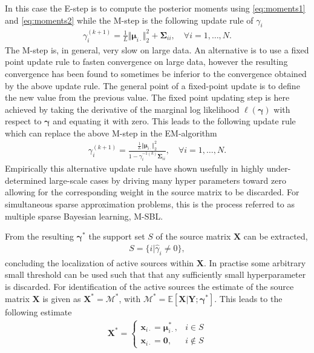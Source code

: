 In this case the E-step is to compute the posterior moments using \eqref{eq:moments1} and \eqref{eq:moments2} while the M-step is the following update rule of $\gamma_i$ \cite[p.147]{phd_wipf}
\begin{align*}
\gamma_i^{(k+1)} = \frac{1}{L} \Vert \boldsymbol{\mu}_{i \cdot} \Vert_2^2 + \boldsymbol{\Sigma}_{ii}, \quad \forall i = 1, \dots, N.
\end{align*}
The M-step is, in general, very slow on large data. 
An alternative is to use a fixed point update rule to fasten convergence on large data, however the resulting convergence has been found to sometimes be inferior to the convergence obtained by the above update rule\cite[p.147]{phd_wipf}. The general point of a fixed-point update is to define the new value from the previous value. 
The fixed point updating step is here achieved by taking the derivative of the marginal log likelihood $\ell(\boldsymbol{\gamma})$ with respect to $\boldsymbol{\gamma}$ and equating it with zero. 
This leads to the following update rule which can replace the above M-step in the EM-algorithm \cite[p.147]{phd_wipf}
\begin{align}
\gamma_i^{(k+1)} = \frac{\frac{1}{L} \Vert \boldsymbol{\mu}_{i \cdot} \Vert_2^2}{1 - \gamma_i^{-1 (k)} \boldsymbol{\Sigma}_{ii}}, \quad \forall i = 1, \dots, N.
\end{align}
Empirically this alternative update rule have shown usefully in highly under-determined large-scale cases by driving many hyper parameters toward zero allowing for the corresponding weight in the source matrix to be discarded. 
For simultaneous sparse approximation problems, this is the process referred to as multiple sparse Bayesian learning, M-SBL.

From the resulting $\boldsymbol{\gamma}^\ast$ the support set $S$ of the source matrix $\mathbf{X}$ can be extracted, 
\begin{align*}
S = \{ i \vert \hat{\gamma}_i \neq 0 \},
\end{align*}
concluding the localization of active sources within $\mathbf{X}$. 
In practise some arbitrary small threshold can be used such that that any sufficiently small hyperparameter is discarded\cite[p.149]{phd_wipf}.
For identification of the active sources the estimate of the source matrix $\mathbf{X}$ is given as $\mathbf{X}^\ast = \mathcal{M}^\ast $, with $\mathcal{M}^\ast = \mathbb{E}[\mathbf{X}\vert \mathbf{Y} ; \boldsymbol{\gamma}^\ast]$. 
This leads to the following estimate  
\begin{align*}
\mathbf{X}^\ast = 
\begin{cases}
\mathbf{x}_{i\cdot} = \boldsymbol{\mu}_{i \cdot}^\ast, & i \in S \\
\mathbf{x}_{i\cdot} = \mathbf{0}, & i \not \in S
\end{cases}
\end{align*}

